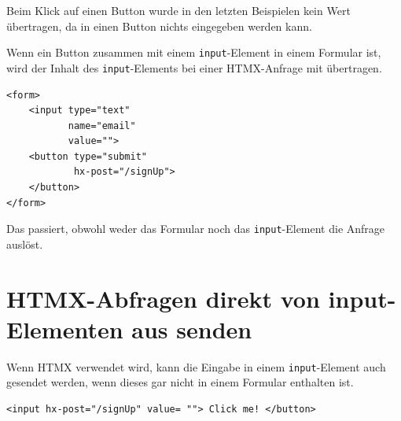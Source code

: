 \documentclass[a4paper]{scrartcl}
\begin{document}
Beim Klick auf einen Button wurde in den letzten Beispielen kein Wert übertragen, da in einen Button nichts eingegeben werden kann.

Wenn ein Button zusammen mit einem \texttt{input}-Element in einem Formular ist, wird der Inhalt des \texttt{input}-Elements bei einer HTMX-Anfrage mit übertragen.

\begin{verbatim}
<form>
    <input type="text"
           name="email"
           value="">
    <button type="submit"
            hx-post="/signUp">
    </button>
</form>
\end{verbatim}

Das passiert, obwohl weder das Formular noch das \texttt{input}-Element die Anfrage auslöst.
%
%

\section{HTMX-Abfragen direkt von input-Elementen aus senden}\label{sec:htmx-abfragen-direkt-von-input-elementen-aus-senden}

Wenn HTMX verwendet wird, kann die Eingabe in einem \texttt{input}-Element
auch gesendet werden, wenn dieses gar nicht in einem Formular enthalten ist.


\begin{verbatim}
<input hx-post="/signUp" value= ""> Click me! </button>
\end{verbatim}
\end{document}
